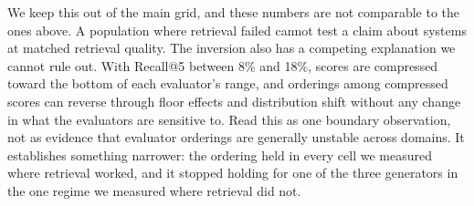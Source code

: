 We keep this out of the main grid, and these numbers are not comparable to the ones above. A population where retrieval failed cannot test a claim about systems at matched retrieval quality. The inversion also has a competing explanation we cannot rule out. With Recall@5 between 8\% and 18\%, scores are compressed toward the bottom of each evaluator's range, and orderings among compressed scores can reverse through floor effects and distribution shift without any change in what the evaluators are sensitive to. Read this as one boundary observation, not as evidence that evaluator orderings are generally unstable across domains. It establishes something narrower: the ordering held in every cell we measured where retrieval worked, and it stopped holding for one of the three generators in the one regime we measured where retrieval did not.

